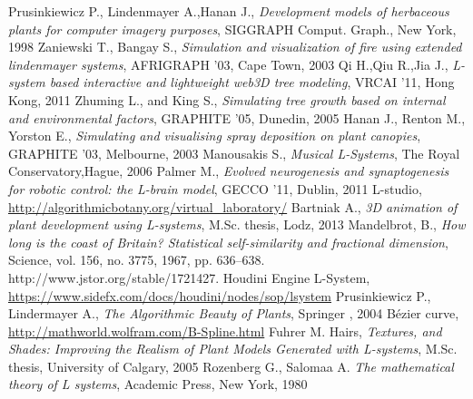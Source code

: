 \documentclass[b5paper,twoside,11pt]{article}
\begin{document}
\begin{thebibliography}{99}
\small
{}Prusinkiewicz P., Lindenmayer A.,Hanan J.,\textit{ Development models of herbaceous plants for computer imagery purposes},  SIGGRAPH Comput. Graph., New York, 1998
 Zaniewski T., Bangay S., \textit{ Simulation and visualization of fire using extended lindenmayer systems}, AFRIGRAPH '03, Cape Town, 2003
Qi H.,Qiu R.,Jia J., \textit{L-system based interactive and lightweight web3D tree modeling}, VRCAI '11, Hong Kong, 2011
  Zhuming L., and King S., \textit{Simulating tree growth based on internal and environmental factors}, GRAPHITE '05, Dunedin, 2005
Hanan J., Renton M., Yorston E., \textit{Simulating and visualising spray deposition on plant canopies}, GRAPHITE '03, Melbourne, 2003
Manousakis S., \textit{Musical L-Systems}, The Royal Conservatory,Hague, 2006
Palmer M., \textit{Evolved neurogenesis and synaptogenesis for robotic control: the L-brain model}, GECCO '11, Dublin, 2011
L-studio, \url{http://algorithmicbotany.org/virtual_laboratory/}
Bartniak A., \textit{3D animation of plant development using L-systems}, M.Sc. thesis, Lodz, 2013
Mandelbrot, B., \textit{How long is the coast of Britain? Statistical self-similarity and fractional dimension}, Science, vol. 156, no. 3775, 1967, pp. 636–638. http://www.jstor.org/stable/1721427.
Houdini Engine L-System, \url{https://www.sidefx.com/docs/houdini/nodes/sop/lsystem}
Prusinkiewicz P., Lindermayer A., \textit{The Algorithmic Beauty of Plants}, Springer , 2004
Bézier curve, \url {http://mathworld.wolfram.com/B-Spline.html}
Fuhrer M. Hairs, \textit{Textures, and Shades: Improving the Realism of Plant Models Generated with L-systems}, M.Sc. thesis, University of Calgary, 2005
 Rozenberg G., Salomaa A. \textit{The mathematical theory of L systems}, Academic Press, New York, 1980

\end{thebibliography}

\ifdefined\PROCINCLUDED
%
\else
\end{document}
